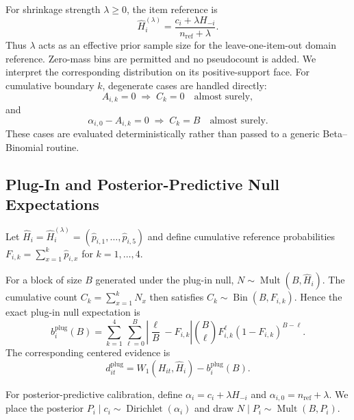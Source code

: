 For shrinkage strength $\lambda\geq0$, the item reference is
\begin{equation}
\label{eq:supp-shrunk-reference}
\widehat H_i^{(\lambda)}
=
\frac{c_i+\lambda H_{-i}}
{n_{\mathrm{ref}}+\lambda}.
\end{equation}
Thus $\lambda$ acts as an effective prior sample size for the
leave-one-item-out domain reference. Zero-mass bins are permitted and no pseudocount is added. We
interpret the corresponding distribution on its positive-support
face. For cumulative boundary $k$, degenerate cases are handled
directly:
\[
A_{i,k}=0
\;\Longrightarrow\;
C_k=0 \quad\text{almost surely},
\]
and
\[
\alpha_{i,0}-A_{i,k}=0
\;\Longrightarrow\;
C_k=B \quad\text{almost surely}.
\]
These cases are evaluated deterministically rather than passed to a
generic Beta--Binomial routine.


\subsection{Plug-In and Posterior-Predictive Null Expectations}
\label{sec:supp-null-expectations}

Let
$\widehat H_i=\widehat H_i^{(\lambda)}
=(\widehat p_{i,1},\ldots,\widehat p_{i,5})$
and define cumulative reference probabilities
$F_{i,k}=\sum_{x=1}^{k}\widehat p_{i,x}$ for $k=1,\ldots,4$.

For a block of size $B$ generated under the plug-in null,
$N\sim\operatorname{Mult}(B,\widehat H_i)$.
The cumulative count $C_k=\sum_{x=1}^{k}N_x$ then satisfies
$C_k\sim\operatorname{Bin}(B,F_{i,k})$. Hence the exact plug-in null
expectation is
\begin{equation}
\label{eq:supp-plugin-expectation}
b_i^{\mathrm{plug}}(B)
=
\sum_{k=1}^{4}
\sum_{\ell=0}^{B}
\left|
\frac{\ell}{B}-F_{i,k}
\right|
\binom{B}{\ell}
F_{i,k}^{\ell}
(1-F_{i,k})^{B-\ell}.
\end{equation}
The corresponding centered evidence is
\begin{equation}
\label{eq:supp-plugin-centered}
d_{it}^{\mathrm{plug}}
=
W_1(H_{it},\widehat H_i)
-
b_i^{\mathrm{plug}}(B).
\end{equation}

For posterior-predictive calibration, define
$\alpha_i=c_i+\lambda H_{-i}$ and
$\alpha_{i,0}=n_{\mathrm{ref}}+\lambda$.
We place the posterior
$P_i\mid c_i\sim\operatorname{Dirichlet}(\alpha_i)$
and draw
$N\mid P_i\sim\operatorname{Mult}(B,P_i)$.

